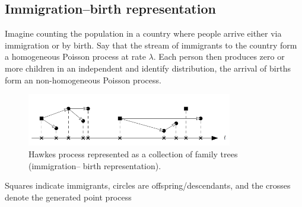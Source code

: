 \subsection{Immigration–birth representation}
 Imagine counting the population in a country where people
 arrive either via immigration or by birth. Say that the stream of immigrants to the country form a homogeneous Poisson process at rate $\lambda$. Each person then produces zero or more children in an independent and identify distribution, the arrival of births form an non-homogeneous Poisson process.
  \begin{figure}[H]
  	\centering
  	\includegraphics[width=0.8\textwidth]{Immigrate_Birth.PNG}
  	\caption{Hawkes process represented as a collection of family trees (immigration–
  		birth representation).}
 
  	\label{Immigrate_Birth}
  \end{figure}
  Squares indicate immigrants, circles are offspring/descendants,
  and the crosses denote the generated point process
